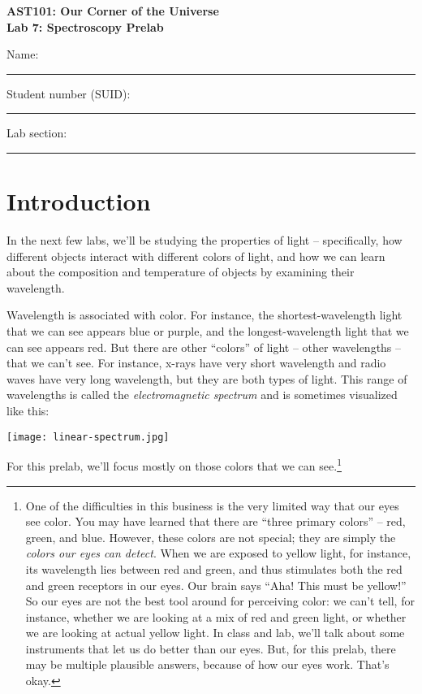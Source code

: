 \documentclass[11pt]{article}
\begin{document}
\begin{center}
\textbf{\Large
AST101: Our Corner of the Universe \\
\vspace*{0.1cm}
Lab 7: Spectroscopy Prelab 
}
\end{center}

\vspace*{0.5cm}

{\Large Name:}\vspace*{0.5cm}\\\hrule
{\Large Student number (SUID):}\vspace*{0.5cm}\\\hrule
{\Large Lab section:}\vspace*{0.5cm}\\\hrule
\vspace*{0.5cm}

\section{Introduction}

In the next few labs, we'll be studying the properties of light -- specifically, how different objects interact with different colors of light, and how we can learn about the composition and temperature of objects by examining their wavelength.

Wavelength is associated with color. For instance, the shortest-wavelength light that we can see appears blue or purple, and the longest-wavelength light that we can see appears red. But there are other ``colors'' of light -- other wavelengths -- that we 
can't see. For instance, x-rays have very short wavelength and radio waves have very long wavelength, but they are both types of light. This range of wavelengths is called the {\it electromagnetic spectrum} and is sometimes visualized like this:

\begin{center}
\texttt{[image: linear-spectrum.jpg]}
\end{center}

For this prelab, we'll focus mostly on those colors that we can see.\footnote{One of the difficulties in this business is the very limited way that our eyes see color. You may have learned that there are ``three primary colors'' -- red, green, and blue. However, these colors are not special; they are simply the {\it colors our eyes
can detect}. When we are exposed to yellow light, for instance, its wavelength lies between red and green, and thus stimulates both the red and green receptors in our eyes. Our brain says ``Aha! This must be yellow!'' So our eyes are not the best tool around
for perceiving color: we can't tell, for instance, whether we are looking at a mix of red and green light, or whether we are looking at actual yellow light. In class and lab, we'll talk about some instruments that let us do better than our eyes. But, for this prelab,
there may be multiple plausible answers, because of how our eyes work. That's okay.}
\end{document}
